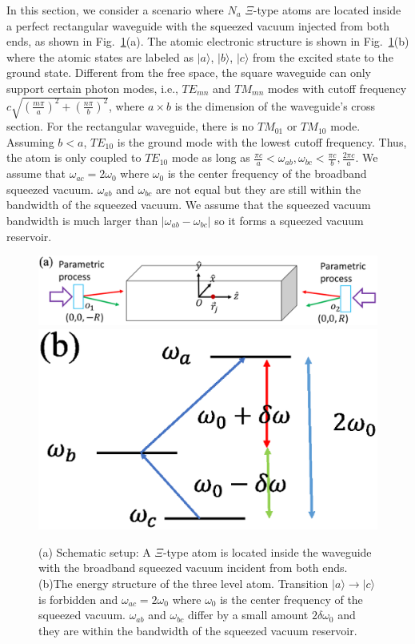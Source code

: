 \documentclass[aps,showpacs,twocolumn,twoside,groupedaddress]{revtex4}
\begin{document}
In this section, we consider a scenario where $N_a$ $\Xi$-type atoms are located inside a perfect rectangular waveguide with the squeezed vacuum injected from both ends, as shown in Fig.~\ref{1}(a). The atomic electronic structure is shown in Fig.~\ref{1}(b) where the atomic states are labeled as $|a\rangle$, $|b\rangle$, $|c\rangle$ from the excited state to the ground state. Different from the free space, the square waveguide can only support certain photon modes, i.e., $TE_{mn}$ and $TM_{mn}$ modes with cutoff frequency $c\sqrt{(\frac{m\pi}{a})^{2}+(\frac{n\pi}{b})^{2}}$, where $a \times b$ is the dimension of the waveguide's cross section. For the rectangular waveguide, there is no $TM_{01}$ or $TM_{10}$ mode. Assuming $b<a$, $TE_{10}$ is the ground mode with the lowest cutoff frequency. Thus, the atom is only coupled to $TE_{10}$ mode as long as $\frac{\pi c}{a}<\omega_{ab},\omega_{bc}<\frac{\pi c}{b},\frac{2\pi c}{a}$. We assume that $\omega_{ac}=2\omega_0$ where $\omega_0$ is the center frequency of the broadband squeezed vacuum.  $\omega_{ab}$ and $\omega_{bc}$ are not equal but they are still within the bandwidth of the squeezed vacuum. We assume that the squeezed vacuum bandwidth is much larger than $|\omega_{ab}-\omega_{bc}|$ so it forms a squeezed vacuum reservoir. 
\begin{figure}
\includegraphics[width=1.5\columnwidth]{fig1.eps}
\includegraphics[width=0.5\columnwidth]{fig2.eps}
\caption{(a) Schematic setup: A $\Xi$-type atom is located inside the waveguide with the broadband squeezed vacuum incident from both ends. (b)The energy structure of the three level atom. Transition $|a\rangle\rightarrow|c\rangle$ is forbidden and $\omega_{ac}=2\omega_0$ where $\omega_0$ is the center frequency of the squeezed vacuum. $\omega_{ab}$ and $\omega_{bc}$ differ by a small amount $2\delta\omega_0$ and they are within the bandwidth of the squeezed vacuum reservoir.}
\label{1}
\end{figure}
\end{document}
